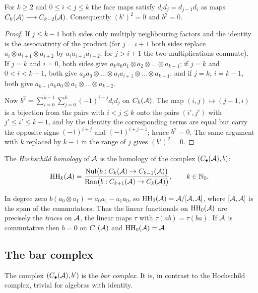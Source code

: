 \begin{lemma}\label{hochschild:lem:simplicial}
For $k\ge2$ and $0\le i<j\le k$ the face maps satisfy
$d_id_j=d_{j-1}d_i$ as maps $C_k(\mathcal{A})\longrightarrow C_{k-2}(\mathcal{A})$.
Consequently $(b')^2=0$ and $b^2=0$.
\end{lemma}
\begin{proof}
If $j\le k-1$ both sides only multiply neighbouring factors and the identity
is the associativity of the product (for $j=i+1$ both sides replace
$a_i\otimes a_{i+1}\otimes a_{i+2}$ by $a_ia_{i+1}a_{i+2}$; for $j>i+1$ the
two multiplications commute). If $j=k$ and $i=0$, both sides give
$a_ka_0a_1\otimes a_2\otimes\dots\otimes a_{k-1}$; if $j=k$ and $0<i<k-1$,
both give $a_ka_0\otimes\dots\otimes a_ia_{i+1}\otimes\dots\otimes a_{k-1}$;
and if $j=k$, $i=k-1$, both give $a_{k-1}a_ka_0\otimes a_1\otimes\dots\otimes
a_{k-2}$.

Now $b^2=\sum_{i=0}^{k-1}\sum_{j=0}^{k}(-1)^{i+j}d_id_j$ on $C_k(\mathcal{A})$. The
map $(i,j)\longmapsto(j-1,i)$ is a bijection from the pairs with $i<j\le k$
onto the pairs $(i',j')$ with $j'\le i'\le k-1$, and by the identity the
corresponding terms are equal but carry the opposite signs $(-1)^{i+j}$ and
$(-1)^{i+j-1}$; hence $b^2=0$. The same argument with $k$ replaced by $k-1$
in the range of $j$ gives $(b')^2=0$.
\end{proof}

\begin{definition}\label{hochschild:def:HH}
The \emph{Hochschild homology} of $\mathcal{A}$ is the homology of the complex
$(C_\bullet(\mathcal{A}),b)$:
\begin{equation*}
  \operatorname{HH}_k(\mathcal{A})=\frac{\operatorname{Nul}\bigl(b:C_k(\mathcal{A})\to C_{k-1}(\mathcal{A})\bigr)}
  {\operatorname{Ran}\bigl(b:C_{k+1}(\mathcal{A})\to C_k(\mathcal{A})\bigr)},\qquad k\in\mathbb{N}_0 .
\end{equation*}
\end{definition}

In degree zero $b(a_0\otimes a_1)=a_0a_1-a_1a_0$, so
$\operatorname{HH}_0(\mathcal{A})=\mathcal{A}/[\mathcal{A},\mathcal{A}]$, where $[\mathcal{A},\mathcal{A}]$ is the span of the commutators.
Thus the linear functionals on $\operatorname{HH}_0(\mathcal{A})$ are precisely the \emph{traces}
on $\mathcal{A}$, the linear maps $\tau$ with $\tau(ab)=\tau(ba)$. If $\mathcal{A}$ is
commutative then $b=0$ on $C_1(\mathcal{A})$ and $\operatorname{HH}_0(\mathcal{A})=\mathcal{A}$.

\subsection{The bar complex}
The complex $(C_\bullet(\mathcal{A}),b')$ is the \emph{bar complex}. It is, in
contrast to the Hochschild complex, trivial for algebras with identity.

